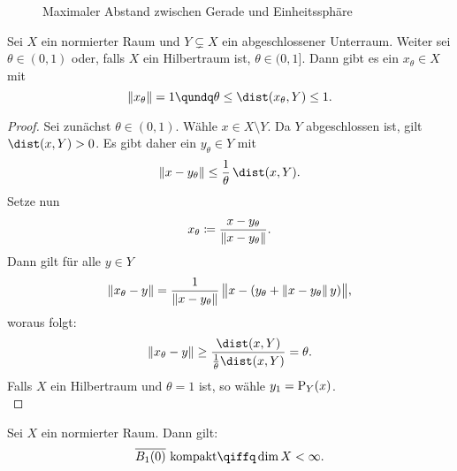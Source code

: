 \begin{thSatz} \label{vl16:fastorthogonaleselem}
    \begin{figure}[b] %
        \centering
        \caption{Maximaler Abstand zwischen Gerade und Einheitssphäre}
        \label{fig:<+label+>}
    \end{figure}
    Sei $X$ ein normierter Raum und $Y\subsetneq X$ ein abgeschlossener Unterraum.
    Weiter sei $\theta\in(0,1)$ oder, falls $X$ ein Hilbertraum ist,
    $\theta\in(0,1]$. Dann gibt es ein $x_\theta\in X$ mit
    \[ \norm{x_\theta} = 1 \qundq \theta\leq\dist(x_\theta,Y)\leq 1   . \]
\end{thSatz}

\begin{proof}
    Sei zunächst $\theta\in(0,1)$.
    Wähle $x\in X\setminus Y$. Da $Y$ abgeschlossen ist, gilt $\dist(x,Y)>0$. Es
    gibt daher ein $y_\theta\in Y$ mit
    \[ \norm{x-y_\theta} \leq \frac{1}{\theta} \, \dist(x,Y)  . \]
    Setze nun
    \[ x_\theta \defeq \frac{x-y_\theta}{\norm{x-y_\theta}}  . \]
    Dann gilt für alle $y\in Y$
    \[ \norm{x_\theta-y} = \frac{1}{\norm{x-y_\theta}} \,
        \norm[\big]{x-(y_\theta+\norm{x-y_\theta}\,y)}
    , \]
    woraus folgt:
    \[ \norm{x_\theta-y} 
        \geq \frac{\dist(x,Y)}{\frac{1}{\theta}\dist(x,Y)} =
        \theta
    . \]
    Falls $X$ ein Hilbertraum und $\theta=1$ ist, so wähle $y_1=\Proj_Y(x)$.
    \\
\end{proof}

\begin{thSatz}
    Sei $X$ ein normierter Raum. Dann gilt:
    \[ \setclosure{B_1(0)} \text{ kompakt} \qiffq \dim X < \infty  . \]
\end{thSatz}

